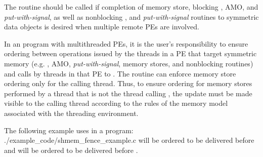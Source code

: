 \begin{apidefinition}
{    The  routine should be called if completion of memory
    store, blocking \PUT{}, \ac{AMO}, and \emph{put-with-signal}, as well as
    nonblocking \PUT{}, and \emph{put-with-signal} routines to symmetric data objects is desired
    when multiple remote \acp{PE} are involved.

    In an \openshmem program with multithreaded \acp{PE}, it is the
    user's responsibility to ensure ordering between operations issued by the threads
    in a \ac{PE} that target symmetric memory (e.g. \PUT{}, \ac{AMO}, \emph{put-with-signal}, memory stores,
    and nonblocking routines) and calls by threads in that \ac{PE} to
    . The  routine can enforce memory store ordering only for the
    calling thread. Thus, to ensure ordering for memory stores performed by a thread that is
    not the thread calling , the update must be made visible to the
    calling thread according to the rules of the memory model associated with
    the threading environment.
}

\begin{apiexamples}

\apicexample
    {The following example uses  in a \Cstd[11] program: }
    {./example_code/shmem_fence_example.c}
    { will be ordered to be delivered before  and 
    will be ordered to be delivered before .}

\end{apiexamples}

\end{apidefinition}

